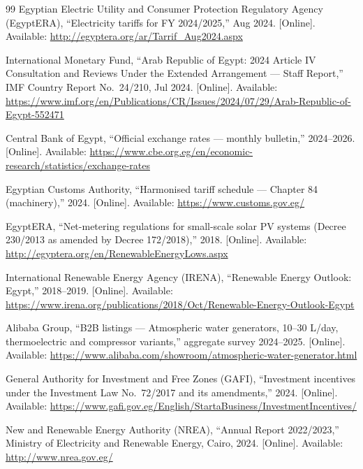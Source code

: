 \documentclass[11pt,a4paper]{article}
\begin{document}
\begin{thebibliography}{99}
Egyptian Electric Utility and Consumer Protection Regulatory Agency (EgyptERA), ``Electricity tariffs for FY 2024/2025,'' Aug 2024. [Online]. Available: \url{http://egyptera.org/ar/Tarrif_Aug2024.aspx}

International Monetary Fund, ``Arab Republic of Egypt: 2024 Article IV Consultation and Reviews Under the Extended Arrangement --- Staff Report,'' IMF Country Report No.~24/210, Jul 2024. [Online]. Available: \url{https://www.imf.org/en/Publications/CR/Issues/2024/07/29/Arab-Republic-of-Egypt-552471}

Central Bank of Egypt, ``Official exchange rates --- monthly bulletin,'' 2024--2026. [Online]. Available: \url{https://www.cbe.org.eg/en/economic-research/statistics/exchange-rates}

Egyptian Customs Authority, ``Harmonised tariff schedule --- Chapter 84 (machinery),'' 2024. [Online]. Available: \url{https://www.customs.gov.eg/}

EgyptERA, ``Net-metering regulations for small-scale solar PV systems (Decree 230/2013 as amended by Decree 172/2018),'' 2018. [Online]. Available: \url{http://egyptera.org/en/RenewableEnergyLows.aspx}

International Renewable Energy Agency (IRENA), ``Renewable Energy Outlook: Egypt,'' 2018--2019. [Online]. Available: \url{https://www.irena.org/publications/2018/Oct/Renewable-Energy-Outlook-Egypt}

Alibaba Group, ``B2B listings --- Atmospheric water generators, 10--30 L/day, thermoelectric and compressor variants,'' aggregate survey 2024--2025. [Online]. Available: \url{https://www.alibaba.com/showroom/atmospheric-water-generator.html}

General Authority for Investment and Free Zones (GAFI), ``Investment incentives under the Investment Law No.~72/2017 and its amendments,'' 2024. [Online]. Available: \url{https://www.gafi.gov.eg/English/StartaBusiness/InvestmentIncentives/}

New and Renewable Energy Authority (NREA), ``Annual Report 2022/2023,'' Ministry of Electricity and Renewable Energy, Cairo, 2024. [Online]. Available: \url{http://www.nrea.gov.eg/}


\end{thebibliography}
\end{document}
